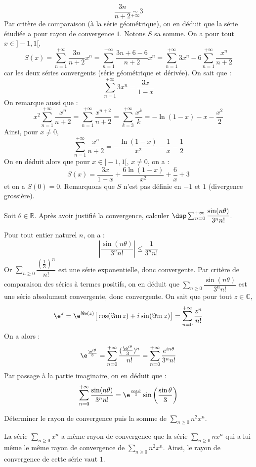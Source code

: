 \documentclass[a4paper,10pt]{report}
\newcommand{\Sum}[2]{\ensuremath{\textstyle{\sum\limits_{#1}^{#2}}}}
\begin{document}
$$  \dfrac{3n}{n+2} \underset{+ \infty}{\sim} 3$$
Par critère de comparaison (à la série géométrique), on en déduit que la série étudiée a pour rayon de convergence $1$. Notons $S$ sa somme. On a pour tout $x \in ]-1,1[$,
$$ S(x) = \sum_{n=1}^{+ \infty}  \dfrac{3n}{n+2} x^n = \sum_{n=1}^{+ \infty}  \dfrac{3n+6-6}{n+2} x^n = \sum_{n=1}^{+ \infty} 3x^n - 6 \sum_{n=1}^{+ \infty} \dfrac{x^n}{n+2}$$
car les deux séries convergents (série géométrique et dérivée). On sait que :
$$ \sum_{n=1}^{+ \infty} 3x^n = \dfrac{3x}{1-x}$$
On remarque aussi que :
$$ x^2 \sum_{n=1}^{+ \infty} \dfrac{x^n}{n+2} = \sum_{n=1}^{+ \infty} \dfrac{x^{n+2}}{n+2} = \sum_{k=3}^{+\infty} \dfrac{x^k}{k} = - \ln(1-x) -x - \dfrac{x^2}{2}   $$
Ainsi, pour $x \neq 0$,
$$ \sum_{n=1}^{+ \infty} \dfrac{x^n}{n+2} = - \dfrac{\ln(1-x)}{x^2} - \dfrac{1}{x} - \dfrac{1}{2}$$
On en déduit alors que pour $x \in ]-1,1[$, $x \neq 0$, on a :
$$ S(x) =  \dfrac{3x}{1-x}  + \dfrac{6\ln(1-x)}{x^2} + \dfrac{6}{x} +3$$
et on a $S(0)= 0$. Remarquons que $S$ n'est pas définie en $-1$ et $1$ (divergence grossière).

\begin{Exercice}{} Soit $\theta\in\mathbb{R}$. Après avoir justifié la convergence, calculer $\dsp\sum_{n=0}^{+\infty}\dfrac{\sin(n\theta)}{3^nn!}$.
\end{Exercice}

\corr Pour tout entier naturel $n$, on a : 
\[
\left\vert\dfrac{\sin(n\theta)}{3^n n!}\right\vert\leq \dfrac{1}{3^n n!}
\]
Or $\Sum{n \geq 0}{} \dfrac{(\frac{1}{3})^n}{ n!}$ est une série exponentielle, donc convergente. Par critère de comparaison des séries à termes positifs, on en déduit que $\Sum{n \geq 0}{} \dfrac{\sin(n\theta)}{3^n n!}$ est une série absolument convergente, donc convergente. On sait que pour tout $z \in \mathbb{C}$,
$$\e^{z}=\e^{\Re\mathrm{e}(z)}\big[\cos(\Im\mathrm{m}\,z)+i\sin(\Im\mathrm{m}\,z) \big]= \sum_{n =0}^{+ \infty} \dfrac{z^n}{n!}$$
On a alors : 
$$ \e^{\frac{\e^{i\theta}}{3}}= \sum_{n=0}^{+\infty}\dfrac{(\frac{\e^{i\theta}}{3})^n}{n!} = \sum_{n=0}^{+ \infty} \dfrac{e^{i n \theta}}{3^n n!}$$
Par passage à la partie imaginaire, on en déduit que :
$$ \sum_{n=0}^{+\infty}\dfrac{\sin(n\theta)}{3^nn!} = \e^{\frac{\cos\theta}{3}}\sin\left(\dfrac{\sin\theta}{3}\right)$$

\begin{Exercice}{} Déterminer le rayon de convergence puis la somme de $\Sum{n \geq 0}{} n^2x^n$.
\end{Exercice}

\corr La série $\Sum{n \geq 0}{} x^n$ a même rayon de convergence que  la série $\Sum{n \geq 0}{} nx^n$ qui a lui même le même rayon de convergence de $\Sum{n \geq 0}{} n^2x^n$. Ainsi, le rayon de convergence de cette série vaut $1$.
\end{document}
